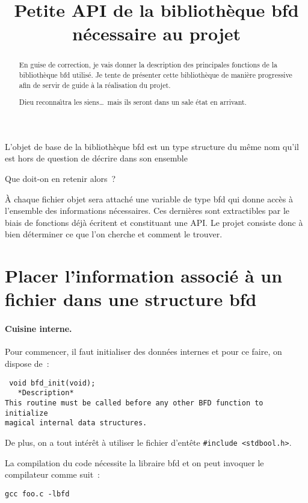 \documentclass{article}
\title{Petite API de la biblioth\`eque bfd n\'ecessaire au projet}
\begin{document}
\maketitle
\begin{abstract}
  En guise de correction, je vais donner la description des
  principales fonctions de la biblioth\`eque bfd utilis\'e. 
  Je tente de pr\'esenter cette biblioth\`eque de mani\`ere
  progressive afin de servir de guide \`a la r\'ealisation du projet.
  \par
  Dieu reconna\^\i{}tra les siens\ldots\ mais ils seront dans un sale \'etat en arrivant.
\end{abstract}

L'objet de base de la biblioth\`eque bfd est un type structure du
m\^eme nom qu'il est hors de question de d\'ecrire dans son ensemble
\par
Que doit-on en retenir alors~?
\par
\`A chaque fichier objet sera attach\'e une variable de type bfd qui
donne acc\`es \`a l'ensemble des informations n\'ecessaires. Ces
derni\`eres sont extractibles par le biais de fonctions d\'ej\`a
\'ecritent et constituant une API. Le projet consiste donc \`a bien
d\'eterminer ce que l'on cherche et comment le trouver.
\section{Placer l'information associ\'e \`a un fichier dans une structure bfd}
\paragraph{Cuisine interne.}
Pour commencer, il faut initialiser des donn\'ees internes et pour ce
faire, on dispose de~:
\begin{verbatim}
 void bfd_init(void);
   *Description*
This routine must be called before any other BFD function to initialize
magical internal data structures.
\end{verbatim}
De plus, on a tout int\'er\^et \`a utiliser le fichier d'ent\^ete \verb+#include <stdbool.h>+.
\par
La compilation du code n\'ecessite la libraire bfd et on peut invoquer
le compilateur comme suit~:
\begin{verbatim}
gcc foo.c -lbfd
\end{verbatim}
\end{document}
